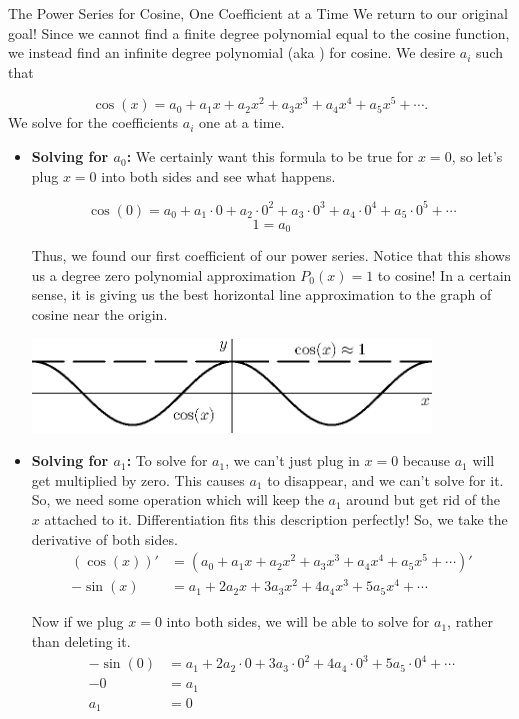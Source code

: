 \begin{example}{The Power Series for Cosine, One Coefficient at a Time}
We return to our original goal!  Since we cannot find a finite degree polynomial equal to the cosine function, we instead find an infinite degree polynomial (aka ) for cosine.  We desire $a_i$ such that

$$\cos(x)=a_0+a_1x+a_2x^2+a_3x^3+a_4x^4+a_5x^5+\cdots. $$
We solve for the coefficients $a_i$ one at a time.
\begin{itemize}
\item {\bf Solving for $a_0$:} We certainly want this formula to be true for $x=0$, so let's plug $x=0$ into both sides and see what happens.

$$\cos(0)=a_0+a_1\cdot 0+a_2\cdot 0^2+a_3\cdot 0^3+a_4\cdot 0^4+a_5\cdot 0^5+\cdots $$
$$1=a_0 $$

Thus, we found our first coefficient of our power series.  Notice that this shows us a degree zero polynomial approximation $P_0(x)=1$ to cosine!  In a certain sense, it is giving us the best horizontal line approximation to the graph of cosine near the origin.

	\begin{center}
		\includegraphics[width=300pt]{ChapterPowerSeries/Figures/cosdeg0.eps}
	\end{center}

\item {\bf Solving for $a_1$:} To solve for $a_1$, we can't just plug in $x=0$ because $a_1$ will get multiplied by zero. This causes $a_1$ to disappear, and we can't solve for it.  So, we need some operation which will keep the $a_1$ around but get rid of the $x$ attached to it.  Differentiation fits this description perfectly!  So, we take the derivative of both sides. 
\begin{align*}
\left(\cos(x)\right)'&=\left(a_0+a_1x+a_2x^2+a_3x^3+a_4x^4+ a_5 x^5+\cdots\right)' \\
-\sin(x)&=a_1+2a_2x+3a_3x^2+4a_4x^3+5 a_5 x^4+\cdots 
\end{align*}

Now if we plug $x=0$ into both sides, we will be able to solve for $a_1$, rather than deleting it.
\begin{align*}
-\sin(0)&=a_1+2a_2\cdot 0+3a_3\cdot 0^2+4a_4\cdot 0^3+5 a_5\cdot 0^4+\cdots \\
-0&=a_1  \\
a_1&=0 
\end{align*}


\end{itemize}
\end{example}
